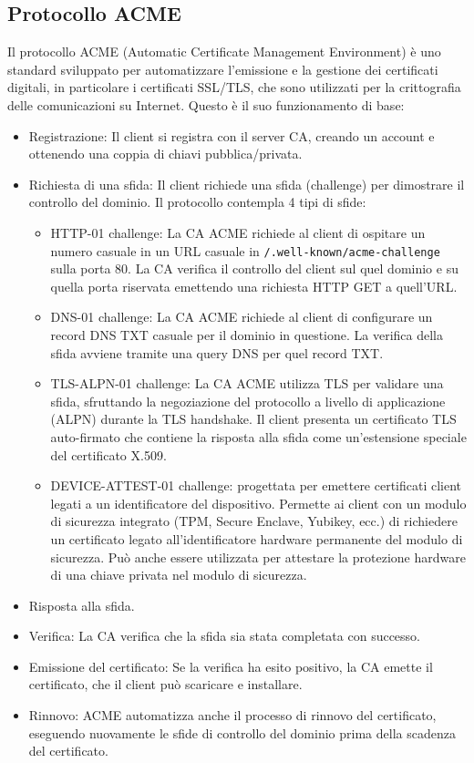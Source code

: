 \documentclass[12pt]{report}
\begin{document}
\subsection{Protocollo ACME}
Il protocollo ACME (Automatic Certificate Management Environment)\cite{acme} è uno standard sviluppato per automatizzare l'emissione e la gestione dei certificati digitali, in particolare i certificati SSL/TLS, che sono utilizzati per la crittografia delle comunicazioni su Internet.
Questo è il suo funzionamento di base:
\begin{itemize}
    \item Registrazione: Il client si registra con il server CA, creando un account e ottenendo una coppia di chiavi pubblica/privata.
    \item Richiesta di una sfida: Il client richiede una sfida (challenge) per dimostrare il controllo del dominio. Il protocollo contempla 4 tipi di sfide\cite{acme-challenges}:
    \begin{itemize}
        \item HTTP-01 challenge: La CA ACME richiede al client di ospitare un numero casuale in un URL casuale in \texttt{/.well-known/acme-challenge} sulla porta 80. La CA verifica il controllo del client sul quel dominio e su quella porta riservata emettendo una richiesta HTTP GET a quell'URL.
        \item DNS-01 challenge: La CA ACME richiede al client di configurare un record DNS TXT casuale per il dominio in questione. La verifica della sfida avviene tramite una query DNS per quel record TXT.
        \item TLS-ALPN-01 challenge: La CA ACME utilizza TLS per validare una sfida, sfruttando la negoziazione del protocollo a livello di applicazione (ALPN) durante la TLS handshake. Il client presenta un certificato TLS auto-firmato che contiene la risposta alla sfida come un'estensione speciale del certificato X.509.
        \item DEVICE-ATTEST-01 challenge: progettata per emettere certificati client legati a un identificatore del dispositivo. Permette ai client con un modulo di sicurezza integrato (TPM, Secure Enclave, Yubikey, ecc.) di richiedere un certificato legato all'identificatore hardware permanente del modulo di sicurezza. Può anche essere utilizzata per attestare la protezione hardware di una chiave privata nel modulo di sicurezza.
    \end{itemize}
    \item Risposta alla sfida.
    \item Verifica: La CA verifica che la sfida sia stata completata con successo.
    \item Emissione del certificato: Se la verifica ha esito positivo, la CA emette il certificato, che il client può scaricare e installare.
    \item Rinnovo: ACME automatizza anche il processo di rinnovo del certificato, eseguendo nuovamente le sfide di controllo del dominio prima della scadenza del certificato.
\end{itemize}
\end{document}
